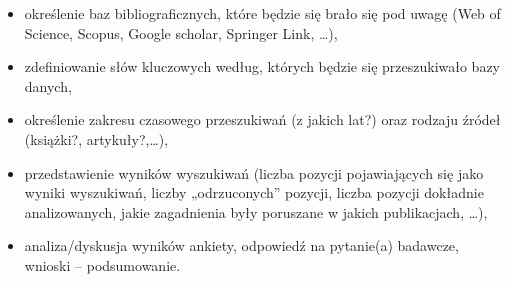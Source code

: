 \begin{itemize}
	\item określenie baz bibliograficznych, które będzie się brało się pod uwagę (Web of Science, Scopus, Google scholar, Springer Link, …),
	\item zdefiniowanie słów kluczowych według, których będzie się przeszukiwało bazy danych,
	\item określenie zakresu czasowego przeszukiwań (z jakich lat?) oraz rodzaju źródeł (książki?, artykuły?,…),
	\item przedstawienie wyników wyszukiwań (liczba pozycji pojawiających się jako wyniki wyszukiwań, liczby „odrzuconych” pozycji, liczba pozycji dokładnie analizowanych, jakie zagadnienia były poruszane w jakich publikacjach, …),
	\item analiza/dyskusja wyników ankiety, odpowiedź na pytanie(a) badawcze, wnioski – podsumowanie.
\end{itemize}

